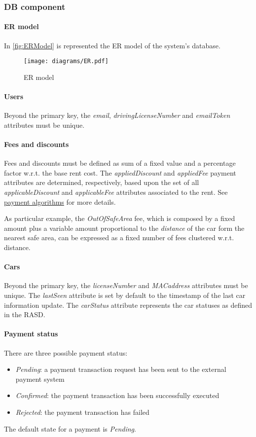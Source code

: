 \subsubsection{DB component}
\paragraph{ER model}In \autoref{fig:ERModel} is represented the ER model of the system's database.

\begin{figure}[h!]
	\centering
	\texttt{[image: diagrams/ER.pdf]}
	\caption{
		\label{fig:ERModel} 
		ER model
	}
\end{figure}

\paragraph{Users} Beyond the primary key, the \mbox{\emph{email}}, \mbox{\emph{drivingLicenseNumber}} and \mbox{\emph{emailToken}} attributes must be unique.

\paragraph{Fees and discounts}
Fees and discounts must be defined as sum of a fixed value and a percentage factor w.r.t. the base rent cost.
The \emph{appliedDiscount} and \emph{appliedFee} payment attributes are determined, respectively, based upon the set of all \emph{applicableDiscount} and \emph{applicableFee} attributes associated to the rent. See \hyperref[sec:paymentAlgorithms]{payment algorithms} for more details.

As particular example, the \emph{OutOfSafeArea} fee, which is composed by a fixed amount plus a variable amount proportional to the \emph{distance} of the car form the nearest safe area, can be expressed as a fixed number of fees clustered w.r.t. distance.

\paragraph{Cars}Beyond the primary key, the \mbox{\emph{licenseNumber}} and \emph{MACaddress} attributes must be unique. The \mbox{\emph{lastSeen}} attribute is set by default to the timestamp of the last car information update. The \mbox{\emph{carStatus}} attribute represents the car statuses as defined in the RASD.

\paragraph{Payment status} There are three possible payment status:
\begin{itemize}
	\item \emph{Pending}: a payment transaction request has been sent to the external payment system
	\item \emph{Confirmed}: the payment transaction has been successfully executed
	\item \emph{Rejected}: the payment transaction has failed
\end{itemize}
The default state for a payment is \emph{Pending}.

